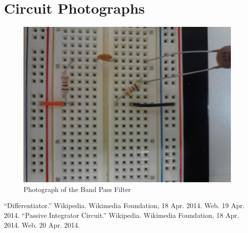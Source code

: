 \documentclass[twocolumn,english]{IEEEtran}
\theoremstyle{plain}
\theoremstyle{plain}
\begin{document}
\section{Circuit Photographs}
\begin{figure}[H]
			\begin{centering}
			\begin{center}
			\includegraphics[width=\linewidth]{./Images/bp_photo.png}
			\caption{Photograph of the Band Pass Filter}
			\label{graph:bp_photo}
			\end{center}
			\par\end{centering}
		\end{figure}


%
%

\begin{thebibliography}{9}
\centering
{}
	``Differentiator.''
	Wikipedia.
	Wikimedia Foundation, 18 Apr. 2014.
	Web.
	19 Apr. 2014.
	``Passive Integrator Circuit.''
	Wikipedia.
	Wikimedia Foundation, 18 Apr. 2014.
	Web.
	20 Apr. 2014.
\end{thebibliography}
\end{document}
